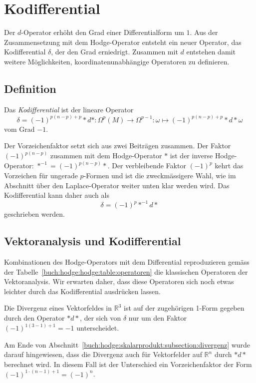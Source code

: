 %
%
%
\section{Kodifferential}
Der $d$-Operator erhöht den Grad einer Differentialform um $1$.
Aus der Zusammensetzung mit dem Hodge-Operator entsteht ein neuer
Operator, das Kodifferential $\delta$, der den Grad erniedrigt.
Zusammen mit $d$ entstehen damit weitere Möglichkeiten,
koordinatenunabhängige Operatoren zu definieren.

%
%
\subsection{Definition}


\begin{definition}[Kodifferential]
Das {\em Kodifferential} ist der lineare Operator
\[
\delta
=
(-1)^{p(n-p)+p}
{\ast}d{\ast}
\colon
\Omega^p(M)\to\Omega^{p-1}
:
\omega \mapsto (-1)^{p(n-p)+p}{\ast}d\ast \omega
\]
vom Grad $-1$.
\end{definition}

Der Vorzeichenfaktor setzt sich aus zwei Beiträgen zusammen.
Der Faktor $(-1)^{p(n-p)}$ zusammen mit dem Hodge-Operator ${\ast}$
ist der inverse Hodge-Operator: $\ast^{-1} = (-1)^{p(n-p)}{\ast}$.
Der verbleibende Faktor $(-1)^p$ kehrt das Vorzeichen für ungerade
$p$-Formen und ist die zweckmässigere Wahl, wie im Abschnitt über
den Laplace-Operator weiter unten klar werden wird.
Das Kodifferential kann daher auch als
\[
\delta
=
(-1)^p
{\ast}^{-1}d{\ast}
\]
geschrieben werden.

%
%
\subsection{Vektoranalysis und Kodifferential}
Kombinationen des Hodge-Operators mit dem Differential reproduzieren
gemäss der Tabelle~\ref{buch:hodge:hodge:table:operatoren} die 
klassischen Operatoren der Vektoranalysis.
Wir erwarten daher, dass diese Operatoren sich noch etwas leichter
durch das Kodifferential ausdrücken lassen.

Die Divergenz eines Vektorfeldes in $\mathbb{R}^3$ ist auf der
zugehörigen 1-Form gegeben durch den Operator ${\ast}d{\ast}$,
der sich von $\delta$ nur um den Faktor $(-1)^{1(3-1)+1}=-1$
unterscheidet.

Am Ende von Abschnitt~\ref{buch:hodge:skalarprodukt:subsection:divergenz}
wurde darauf hingewiesen, dass die Divergenz auch für Vektorfelder
auf $\mathbb{R}^n$ durch ${\ast}d{\ast}$ berechnet wird.
In diesem Fall ist der Unterschied ein Vorzeichenfaktor der Form
$(-1)^{1\cdot(n-1)+1}=(-1)^n$.

